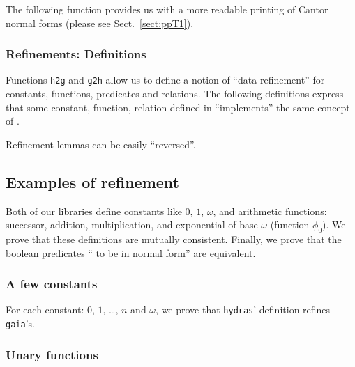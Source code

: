 The following function provides us with a more readable  printing of Cantor normal forms (please see Sect.~\vref{sect:ppT1}).





\subsubsection{Refinements: Definitions}


Functions \texttt{h2g} and \texttt{g2h} allow us to define
a notion of ``data-refinement''  for constants, functions, predicates and relations. The following definitions express that some
constant, function, relation defined in \HydrasLib ``implements'' the same concept of \gaia.









Refinement lemmas can be easily ``reversed''.


\subsection{Examples of refinement}
Both of our libraries define constants like $0$, $1$, $\omega$, and arithmetic functions: successor, addition, multiplication, and exponential of base $\omega$ (function $\phi_0$). We prove that these definitions are mutually consistent. Finally, we prove that the boolean predicates `` to be in normal form'' are equivalent.

\subsubsection{A few constants}
For each constant: $0$, $1$, \dots, $n$ and $\omega$, we prove
that \texttt{hydras}' definition refines \texttt{gaia}'s.


\subsubsection{Unary functions}


